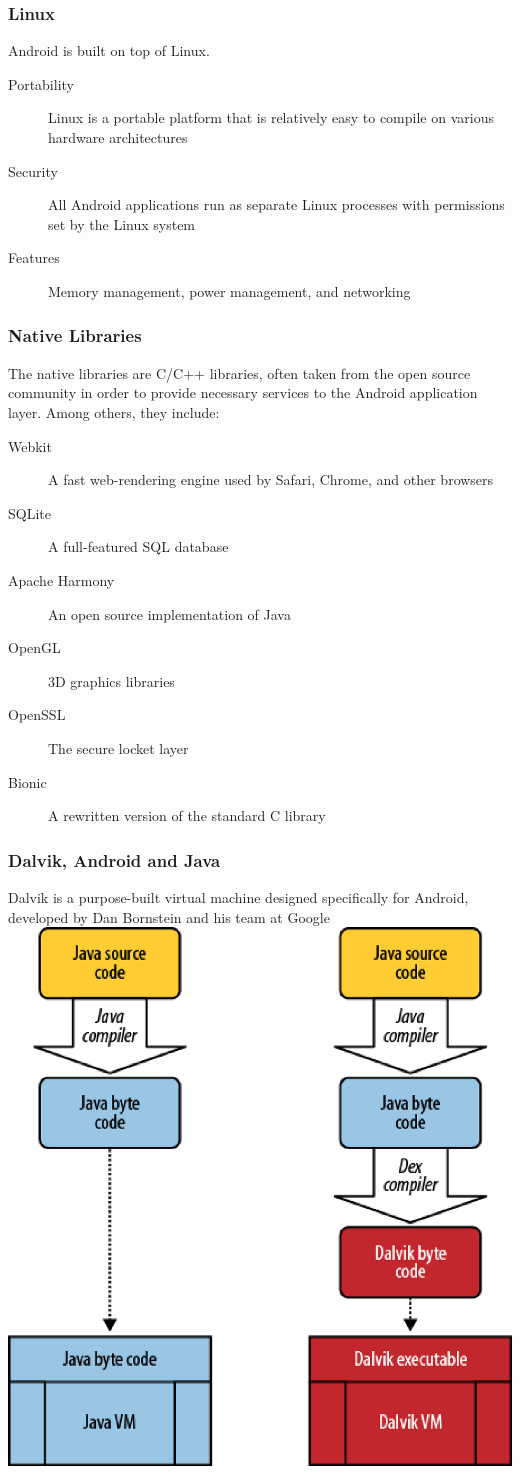 \begin{frame}
\frametitle{Linux}
Android is built on top of \alert{Linux}.
\begin{description}
	\item[Portability] Linux is a portable platform that is relatively easy to compile on various hardware architectures
	\item[Security] All Android applications run as separate Linux processes with permissions set by the Linux system
	\item[Features] Memory management, power management, and networking
\end{description}
\end{frame}
\begin{frame}
\frametitle{Native Libraries}
The \alert{native libraries} are C/C++ libraries, often taken from the open source community
in order to provide necessary services to the Android application layer. Among others,
they include:
\begin{description}
	\item[Webkit] A fast web-rendering engine used by Safari, Chrome, and other browsers
	\item[SQLite] A full-featured SQL database
	\item[Apache Harmony] An open source implementation of Java
	\item[OpenGL] 3D graphics libraries
	\item[OpenSSL] The secure locket layer
	\item[Bionic] A rewritten version of the standard C library
\end{description}
\end{frame}
\begin{frame}
\frametitle{Dalvik, Android and  Java}
\alert{Dalvik} is a purpose-built virtual machine designed specifically for Android, developed
by Dan Bornstein and his team at Google
\centering
\includegraphics[width= 0.40 \linewidth]{fig-9.eps}
\end{frame}

